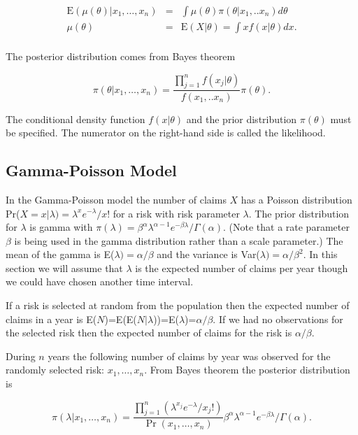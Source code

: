 \documentclass[]{book}
\theoremstyle{definition}
\theoremstyle{definition}
\theoremstyle{definition}
\theoremstyle{remark}
\begin{document}
\begin{eqnarray*}  
\mathrm{E}(\mu(\theta)|x_1,\ldots,x_n)&=&\int \mu(\theta) \pi(\theta|x_1,..x_n) d\theta \\
                           \mu(\theta)&=&\mathrm{E}(X|\theta)=\int  xf(x|\theta) dx .\\
\end{eqnarray*}

The posterior distribution comes from Bayes theorem

\begin{equation*} 
\pi(\theta|x_1,\ldots,x_n)=\frac{\prod_{j=1}^{n} f(x_j|\theta)}{f(x_1,..x_n)}\pi({\theta}).
\end{equation*}

The conditional density function \(f(x|\theta)\) and the prior
distribution \(\pi(\theta)\) must be specified. The numerator on the
right-hand side is called the likelihood.

\subsection{Gamma-Poisson Model}\label{S:Gamma-Poisson}

In the Gamma-Poisson model the number of claims \(X\) has a Poisson
distribution Pr(\(X=x|\lambda)=\lambda^xe^{-\lambda}/x!\) for a risk
with risk parameter \(\lambda\). The prior distribution for \(\lambda\)
is gamma with
\(\pi(\lambda)=\beta^\alpha\lambda^{\alpha-1}e^{-\beta\lambda}/\Gamma(\alpha)\).
(Note that a rate parameter \(\beta\) is being used in the gamma
distribution rather than a scale parameter.) The mean of the gamma is
E(\(\lambda)=\alpha/\beta\) and the variance is
Var(\(\lambda)=\alpha/\beta^2\). In this section we will assume that
\(\lambda\) is the expected number of claims per year though we could
have chosen another time interval.

If a risk is selected at random from the population then the expected
number of claims in a year is
E(\(N\))=E(E(\(N|\lambda\)))=E(\(\lambda\))=\(\alpha/\beta\). If we had
no observations for the selected risk then the expected number of claims
for the risk is \(\alpha/\beta\).

During \(n\) years the following number of claims by year was observed
for the randomly selected risk: \(x_1,\ldots,x_n\). From Bayes theorem
the posterior distribution is

\begin{equation*} 
\pi(\lambda|x_1,\ldots,x_n)=\frac{\prod_{j=1}^{n} (\lambda^{x_j}e^{-\lambda}/x_j!)}{\Pr(x_1,\ldots,x_n)}\beta^\alpha\lambda^{\alpha-1}e^{-\beta\lambda}/\Gamma(\alpha). 
\end{equation*}
\end{document}
